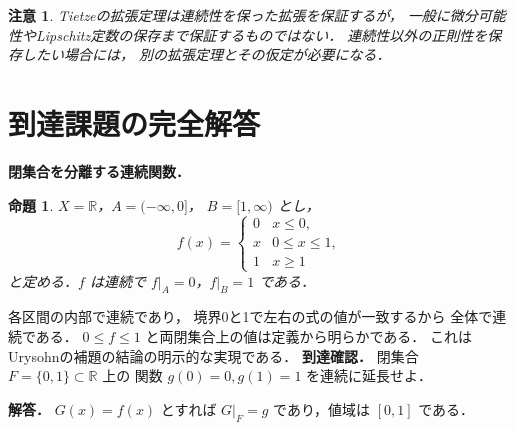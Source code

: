 \documentclass[a5paper,10pt,onecolumn]{jsarticle}
\makeatletter
\theoremstyle{mathnotetheorem}
\newtheorem{proposition}[theorem]{命題}
\newtheorem{remark}[theorem]{注意}
\renewcommand{\proofname}{証明}
\renewenvironment{proof}[1][\proofname]{%
  \par\pushQED{\qed}\normalfont\topsep4\p@\@plus2\p@\relax
  \trivlist\item[\hskip\labelsep\bfseries #1]\ignorespaces
}{\popQED\endtrivlist\@endpefalse}
\makeatother
\begin{document}
\begin{remark}
Tietzeの拡張定理は連続性を保った拡張を保証するが，
一般に微分可能性やLipschitz定数の保存まで保証するものではない．
連続性以外の正則性を保存したい場合には，
別の拡張定理とその仮定が必要になる．
\end{remark}


\section{到達課題の完全解答}
\noindent\textbf{閉集合を分離する連続関数．}
\begin{proposition}
$X=\mathbb R$，$A=(-\infty,0]$，
$B=[1,\infty)$ とし，
\[
f(x)=
\begin{cases}
0&x\le0,\\
x&0\le x\le1,\\
1&x\ge1
\end{cases}
\]
と定める．$f$ は連続で
$f|_A=0$，$f|_B=1$ である．
\end{proposition}
\begin{proof}
各区間の内部で連続であり，
境界0と1で左右の式の値が一致するから
全体で連続である．
$0\le f\le1$ と両閉集合上の値は定義から明らかである．
これはUrysohnの補題の結論の明示的な実現である．
\end{proof}
\noindent\textbf{到達確認．}
閉集合 $F=\{0,1\}\subset\mathbb R$ 上の
関数 $g(0)=0,g(1)=1$ を連続に延長せよ．
\par\noindent\textbf{解答．}
$G(x)=f(x)$ とすれば
$G|_F=g$ であり，値域は $[0,1]$ である．
\end{document}
